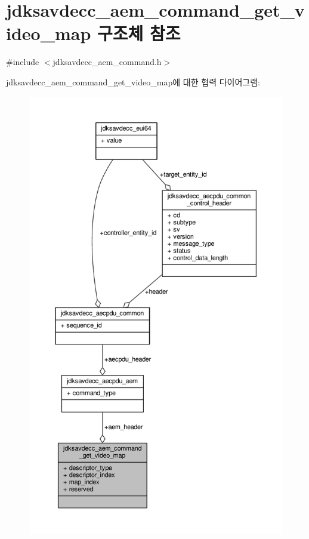 \hypertarget{structjdksavdecc__aem__command__get__video__map}{}\section{jdksavdecc\+\_\+aem\+\_\+command\+\_\+get\+\_\+video\+\_\+map 구조체 참조}
\label{structjdksavdecc__aem__command__get__video__map}


{\ttfamily \#include $<$jdksavdecc\+\_\+aem\+\_\+command.\+h$>$}



jdksavdecc\+\_\+aem\+\_\+command\+\_\+get\+\_\+video\+\_\+map에 대한 협력 다이어그램\+:
\nopagebreak
\begin{figure}[H]
\begin{center}
\leavevmode
\includegraphics[height=550pt]{structjdksavdecc__aem__command__get__video__map__coll__graph}
\end{center}
\end{figure}

